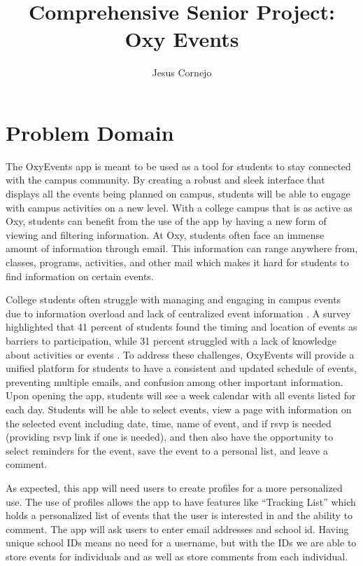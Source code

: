 \documentclass[10pt,twocolumn]{article}
\title{Comprehensive Senior Project: Oxy Events}
\author{Jesus Cornejo}
\affiliation{Occidental College}
\begin{document}
\maketitle

\section{Problem Domain}
The OxyEvents app is meant to be used as a tool for students to stay connected with the campus community. By creating a robust and sleek interface that displays all the events being planned on campus, students will be able to engage with campus activities on a new level. With a college campus that is as active as Oxy, students can benefit from the use of the app by having a new form of viewing and filtering information. At Oxy, students often face an immense amount of information through email. This information can range anywhere from, classes, programs, activities, and other mail which makes it hard for students to find information on certain events.

College students often struggle with managing and engaging in campus events due to information overload and lack of centralized event information \cite{SurveyStudentInvolve}. A survey highlighted that 41 percent of students found the timing and location of events as barriers to participation, while 31 percent struggled with a lack of knowledge about activities or events \cite{SurveyStudentInvolve}. To address these challenges, OxyEvents will provide a unified platform for students to have a consistent and updated schedule of events, preventing multiple emails, and confusion among other important information. Upon opening the app, students will see a week calendar with all events listed for each day. Students will be able to select events, view a page with information on the selected event including date, time, name of event, and if rsvp is needed (providing rsvp link if one is needed), and then also have the opportunity to select reminders for the event, save the event to a personal list, and leave a comment.

As expected, this app will need users to create profiles for a more personalized use. The use of profiles allows the app to have features like “Tracking List” which holds a personalized list of events that the user is interested in and the ability to comment. The app will ask users to enter email addresses and school id. Having unique school IDs means no need for a username, but with the IDs we are able to store events for individuals and as well as store comments from each individual.  
\end{document}
